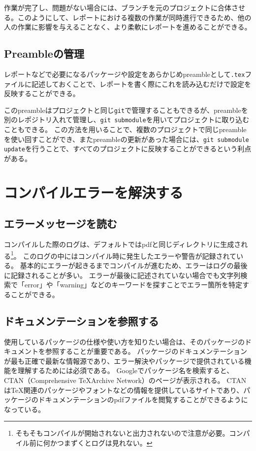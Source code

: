 作業が完了し、問題がない場合には、ブランチを元のプロジェクトに合体させる。このようにして、レポートにおける複数の作業が同時進行できるため、他の人の作業に影響を与えることなく、より柔軟にレポートを進めることができる。

\subsection{Preambleの管理}
レポートなどで必要になるパッケージや設定をあらかじめpreambleとして\verb|.tex|ファイルに記述しておくことで、レポートを書く際にこれを読み込むだけで設定を反映することができる。

このpreambleはプロジェクトと同じ\verb|git|で管理することもできるが、preambleを別のレポジトリ入れて管理し、\verb|git submodule|を用いてプロジェクトに取り込むこともできる。
この方法を用いることで、複数のプロジェクトで同じpreambleを使い回すことができ、またpreambleの更新があった場合には、\verb|git submodule update|を行うことで、すべてのプロジェクトに反映することができるという利点がある。

\section{コンパイルエラーを解決する}

\subsection{エラーメッセージを読む}

コンパイルした際のログは、デフォルトではpdfと同じディレクトリに生成される\footnote{そもそもコンパイルが開始されないと出力されないので注意が必要。コンパイル前に何かつまずくとログは見れない。}。
このログの中にはコンパイル時に発生したエラーや警告が記録されている。
基本的にエラーが起きるまでコンパイルが進むため、エラーはログの最後に記録されることが多い。
エラーが最後に記述されていない場合でも文字列検索で「error」や「warning」などのキーワードを探すことでエラー箇所を特定することができる。

\subsection{ドキュメンテーションを参照する}

使用しているパッケージの仕様や使い方を知りたい場合は、そのパッケージのドキュメントを参照することが重要である。
パッケージのドキュメンテーションが最も正確で最新な情報源であり、エラー解決やパッケージで提供されている機能を理解するためには必須である。
Googleでパッケージ名を検索すると、CTAN（Comprehensive \TeX Archive Network）のページが表示される。
CTANは\TeX 関連のパッケージやフォントなどの情報を提供しているサイトであり、パッケージのドキュメンテーションのpdfファイルを閲覧することができるようになっている。